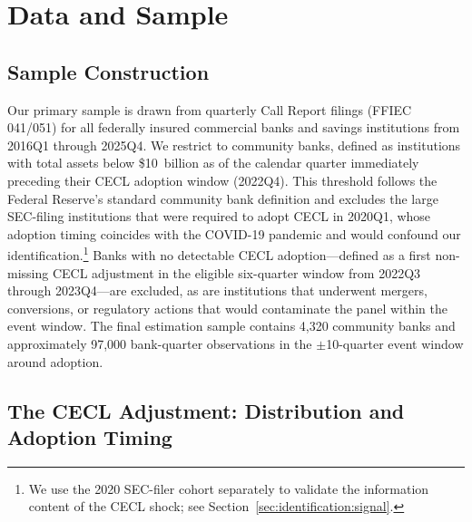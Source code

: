 
\section{Data and Sample}
\label{sec:data}

\subsection{Sample Construction}
\label{sec:data:sample}

Our primary sample is drawn from quarterly Call Report filings (FFIEC 041/051)
for all federally insured commercial banks and savings institutions from
2016Q1 through 2025Q4. We restrict to community banks, defined as institutions
with total assets below \$10~billion as of the calendar quarter immediately
preceding their CECL adoption window (2022Q4). This threshold follows the
Federal Reserve's standard community bank definition and excludes the large
SEC-filing institutions that were required to adopt CECL in 2020Q1, whose
adoption timing coincides with the COVID-19 pandemic and would confound our
identification.\footnote{We use the 2020 SEC-filer cohort separately to validate
  the information content of the CECL shock; see
  Section~\ref{sec:identification:signal}.} Banks with no detectable CECL
adoption---defined as a first non-missing CECL adjustment in the eligible
six-quarter window from 2022Q3 through 2023Q4---are excluded, as are
institutions that underwent mergers, conversions, or regulatory actions that
would contaminate the panel within the event window. The final estimation sample
contains 4,320 community banks and approximately 97,000 bank-quarter
observations in the $\pm$10-quarter event window around adoption.

\subsection{The CECL Adjustment: Distribution and Adoption Timing}
\label{sec:data:cecl}


